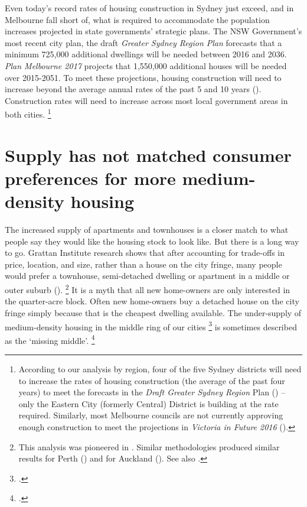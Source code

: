 Even today's record rates of housing construction in Sydney just exceed, and in Melbourne fall short of, what is required to accommodate the population increases projected in state governments' strategic plans.
The NSW Government's most recent city plan, the draft \emph{Greater Sydney Region Plan} forecasts that a minimum 725,000 additional dwellings will be needed between 2016 and 2036.
\emph{Plan Melbourne 2017} projects that 1,550,000 additional houses will be needed over 2015-2051.
To meet these projections, housing construction will need to increase beyond the average annual rates of the past 5 and 10 years ().
Construction rates will need to increase across most local government areas in both cities.%
	\footnote{According to our analysis by region, four of the five Sydney districts will need to increase the rates of housing construction (the average of the past four years) to meet the forecasts in the \textit{Draft Greater Sydney Region} Plan (\textcite{GSC-2017-draftplan}) -- only the Eastern City (formerly Central) District is building at the rate required. Similarly, most Melbourne councils are not currently approving enough construction to meet the projections in \textit{Victoria in Future 2016} (\textcite{DEWLP2016VicFuture}).}

\section{Supply has not matched consumer preferences for more medium-density housing}\label{sec:supply-has-not-matched-consumer-preferences-well}
\label{sec:additional-supply-has-not-matched-consumer-preferences}

The increased supply of apartments and townhouses is a closer match to what people say they would like the housing stock to look like.
But there is a long way to go.
Grattan Institute research shows that after accounting for trade-offs in price, location, and size, rather than a house on the city fringe, many people would prefer a townhouse, semi-detached dwelling or apartment in a middle or outer suburb ().%
    \footnote{This analysis was pioneered in \textcite{KellyWeidmannWalsh2011}.
	Similar methodologies produced similar results for Perth (\textcite{HousingWedChoose2013WA}) and for Auckland (\textcite{YeomanAkehurst2015}).
	See also \textcite{Newton-2017-becoming-urban}.}
It is a myth that all new home-owners are only interested in the quarter-acre block.
Often new home-owners buy a detached house on the city fringe simply because that is the cheapest dwelling available.
The under-supply of medium-density housing in the middle ring of our cities%
	\footcites{KellyWeidmannWalsh2011}[][xx]{KellyDonegan2015-City-limits}[][20]{Treasury2010HousingSupply}
is sometimes described as the `missing middle'.%
	\footcite{NSWGovDesign2016}

